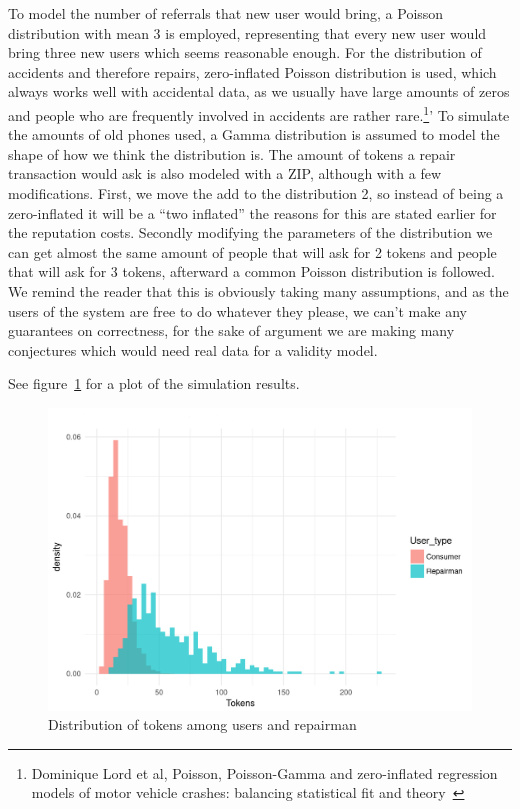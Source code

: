 \documentclass[11pt]{scrartcl}
\begin{document}
To model the number of referrals that new user would bring, a Poisson distribution with mean 3 is employed, representing that every new user would bring three new users which seems reasonable enough. For the distribution of accidents and therefore repairs, zero-inflated Poisson distribution is used, which always works well with accidental data, as we usually have large amounts of zeros and people who are frequently involved in accidents are rather rare.\footnote{Dominique Lord et al, Poisson, Poisson-Gamma and zero-inflated regression models of motor vehicle crashes: balancing statistical fit and theory~\cite{Statistics}}' To simulate the amounts of old phones used, a Gamma distribution is assumed to model the shape of how we think the distribution is. The amount of tokens a repair transaction would ask is also modeled with a ZIP, although with a few modifications. First, we move the add to the distribution 2, so instead of being a zero-inflated it will be a ``two inflated'' the reasons for this are stated earlier for the reputation costs. Secondly modifying the parameters of the distribution we can get almost the same amount of people that will ask for 2 tokens and people that will ask for 3 tokens, afterward a common Poisson distribution is followed. We remind the reader that this is obviously taking many assumptions, and as the users of the system are free to do whatever they please, we can't make any guarantees on correctness, for the sake of argument we are making many conjectures which would need real data for a validity model. 

See figure~\ref{fig:analysis} for a plot of the simulation results.

\begin{figure}[H]
    \includegraphics[width=\textwidth]{img/analysis}
    \caption{Distribution of tokens among users and repairman}%
    \label{fig:analysis}
\end{figure}
\end{document}
